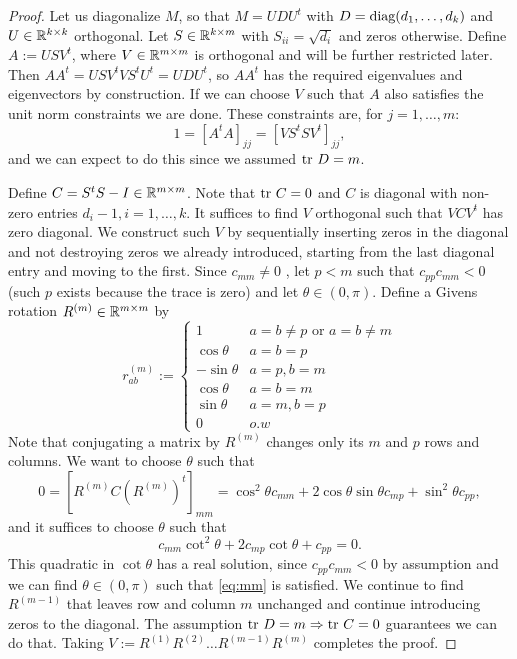 \begin{proof}
  Let us diagonalize $M$, so that $M = U D U^t$ with $D =
  \textup{diag}(d_1,\dots,d_k)$ and $U \in \mathbb{R}^{k \times k }$ orthogonal. Let
  $S \in \mathbb{R}^{k \times m}$ with $S_{ii} = \sqrt{d_{i}}$ and zeros
  otherwise. Define $A:= U S V^t$, where $V \in \mathbb{R}^{m \times m}$ is
  orthogonal and will be further restricted later. Then $AA^t = U
  SV^tVS^t U^t = UDU^t$, so $AA^t$ has the required eigenvalues and
  eigenvectors by construction. If we can choose $V$ such that $A$
  also satisfies the unit norm constraints we are done. These
  constraints are, for $j=1,\dots,m$:
  \begin{equation}\label{eq:V constraints}
   1 = [A^tA]_{jj} = [V S^tS V^t]_{jj},
  \end{equation}
  and we can expect to do this since we assumed $\textup{tr}\ D = m$.

  Define $C = S^tS - I \in \mathbb{R}^{m \times m}$. Note that $\textup{tr}\ C = 0$ and
  $C$ is diagonal with non-zero entries $d_i-1,i=1,\dots,k$. It suffices
  to find $V$ orthogonal such that $V C V^t$ has zero diagonal. We
  construct such $V$ by sequentially inserting zeros in the diagonal
  and not destroying zeros we already introduced, starting from the
  last diagonal entry and moving to the first. Since $c_{mm} \neq 0$ ,
  let $p < m$ such that $c_{pp}c_{mm} < 0$ (such $p$ exists because
  the trace is zero) and let $\theta \in (0,\pi)$. Define a Givens
  rotation $R^{(m)} \in \mathbb{R}^{m \times m}$ by
  \begin{equation*}
    r^{(m)}_{ab} :=
    \begin{cases}
      1 & a = b \neq p \text{ or } a = b \neq m \\
      \cos \theta & a = b = p  \\
     -\sin \theta & a = p, b = m\\
      \cos \theta & a = b = m \\
      \sin \theta & a = m, b = p \\ 
      0 & o.w
    \end{cases}
  \end{equation*}
  Note that conjugating a matrix by $R^{(m)}$ changes only its $m$ and
  $p$ rows and columns. We want to choose $\theta$ such that
  \begin{equation}\label{eq:mm}
    0 = [R^{(m)} C (R^{(m)})^t]_{mm} = \cos^2 \theta c_{mm} + 2\cos \theta \sin
    \theta c_{mp} + \sin^2\theta c_{pp},
  \end{equation}
  and it suffices to choose $\theta$ such that
  \begin{equation*}
    c_{mm} \cot^2 \theta + 2 c_{mp} \cot \theta + c_{pp} = 0.
  \end{equation*}
  This quadratic in $\cot\theta$ has a real solution, since
  $c_{pp}c_{mm} < 0$ by assumption and we can find $\theta \in
  (0,\pi)$ such that \eqref{eq:mm} is satisfied. We continue to find
  $R^{(m-1)}$ that leaves row and column $m$ unchanged and
  continue introducing zeros to the diagonal. The assumption $\textup{tr}\ D =
  m \Rightarrow \textup{tr}\ C = 0$ guarantees we can do that. Taking $V:=
  R^{(1)} R^{(2)} \dots R^{(m-1)}R^{(m)}$ completes the proof.
\end{proof}

